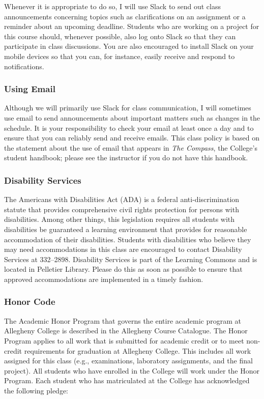 Whenever it is appropriate to do so, I will use Slack to send out class announcements concerning topics such as
clarifications on an assignment or a reminder about an upcoming deadline. Students who are working on a project for this
course should, whenever possible, also log onto Slack so that they can participate in class discussions. You are also
encouraged to install Slack on your mobile devices so that you can, for instance, easily receive and respond to
notifications.

\subsubsection*{Using Email}

Although we will primarily use Slack for class communication, I will sometimes use email to send announcements about
important matters such as changes in the schedule. It is your responsibility to check your email at least once a day and
to ensure that you can reliably send and receive emails. This class policy is based on the statement about the use of
email that appears in {\em The Compass}, the College's student handbook; please see the instructor if you do not have
this handbook.

\subsubsection*{Disability Services}

The Americans with Disabilities Act (ADA) is a federal anti-discrimination statute that provides comprehensive civil
rights protection for persons with disabilities. Among other things, this legislation requires all students with
disabilities be guaranteed a learning environment that provides for reasonable accommodation of their disabilities.
Students with disabilities who believe they may need accommodations in this class are encouraged to contact Disability
Services at 332--2898. Disability Services is part of the Learning Commons and is located in Pelletier Library.
Please do this as soon as possible to ensure that approved accommodations are implemented in a timely fashion.

\subsubsection*{Honor Code}

The Academic Honor Program that governs the entire academic program at Allegheny College is described in the Allegheny
Course Catalogue. The Honor Program applies to all work that is submitted for academic credit or to meet non-credit
requirements for graduation at Allegheny College. This includes all work assigned for this class (e.g., examinations,
laboratory assignments, and the final project). All students who have enrolled in the College will work under the Honor
Program. Each student who has matriculated at the College has acknowledged the following pledge:


